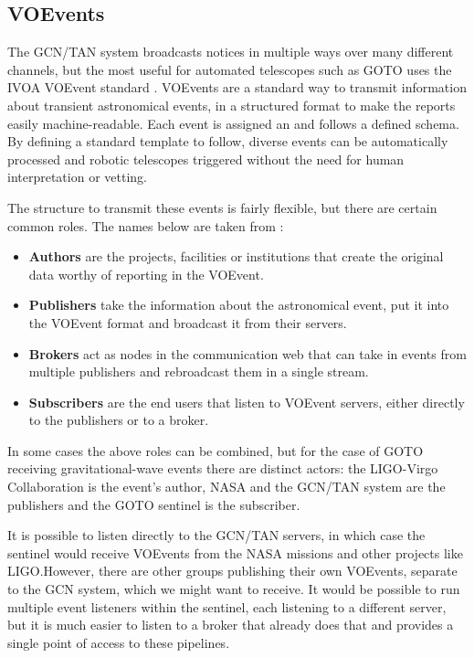 \subsection{VOEvents}
\label{sec:voevents}
\begin{colsection}

The GCN/TAN system broadcasts notices in multiple ways over many different channels, but the most useful for automated telescopes such as GOTO uses the IVOA VOEvent standard \citep{voevent}. VOEvents are a standard way to transmit information about transient astronomical events, in a structured format to make the reports easily machine-readable. Each event is assigned an  and follows a defined schema. By defining a standard template to follow, diverse events can be automatically processed and robotic telescopes triggered without the need for human interpretation or vetting.

The structure to transmit these events is fairly flexible, but there are certain common roles. The names below are taken from \citet{voevent}:

\begin{itemize}
    \item \textbf{Authors} are the projects, facilities or institutions that create the original data worthy of reporting in the VOEvent.
    \item \textbf{Publishers} take the information about the astronomical event, put it into the VOEvent format and broadcast it from their servers.
    \item \textbf{Brokers} act as nodes in the communication web that can take in events from multiple publishers and rebroadcast them in a single stream.
    \item \textbf{Subscribers} are the end users that listen to VOEvent servers, either directly to the publishers or to a broker.
\end{itemize}

In some cases the above roles can be combined, but for the case of GOTO receiving gravitational-wave events there are distinct actors: the LIGO-Virgo Collaboration is the event's author, NASA and the GCN/TAN system are the publishers and the GOTO sentinel is the subscriber.

It is possible to listen directly to the GCN/TAN servers, in which case the sentinel would receive VOEvents from the NASA missions and other projects like LIGO.\@ However, there are other groups publishing their own VOEvents, separate to the GCN system, which we might want to receive. It would be possible to run multiple event listeners within the sentinel, each listening to a different server, but it is much easier to listen to a broker that already does that and provides a single point of access to these pipelines.


\end{colsection}
